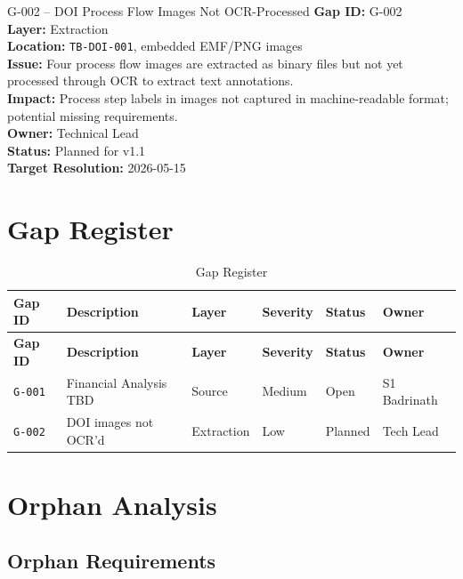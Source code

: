 \documentclass[11pt,a4paper,twoside]{report}
\newcommand{\srcref}[1]{\texttt{#1}}
\newcommand{\gapref}[1]{\texttt{#1}}
\begin{document}
\begin{gapbox}{G-002 -- DOI Process Flow Images Not OCR-Processed}
\textbf{Gap ID:} G-002 \\
\textbf{Layer:} Extraction \\
\textbf{Location:} \srcref{TB-DOI-001}, embedded EMF/PNG images \\
\textbf{Issue:} Four process flow images are extracted as binary files but
not yet processed through OCR to extract text annotations. \\
\textbf{Impact:} Process step labels in images not captured in machine-readable
format; potential missing requirements. \\
\textbf{Owner:} Technical Lead \\
\textbf{Status:} Planned for v1.1 \\
\textbf{Target Resolution:} 2026-05-15
\end{gapbox}

\section{Gap Register}
\label{sec:gap-register}

\begin{longtable}{@{}C{1.5cm}L{4cm}C{2cm}C{2cm}C{2cm}C{2cm}@{}}
\caption{Gap Register}
\label{tab:gap-register} \\
\toprule
\textbf{Gap ID} & \textbf{Description} & \textbf{Layer} & \textbf{Severity} & \textbf{Status} & \textbf{Owner} \\
\midrule
\endfirsthead
\toprule
\textbf{Gap ID} & \textbf{Description} & \textbf{Layer} & \textbf{Severity} & \textbf{Status} & \textbf{Owner} \\
\midrule
\endhead
\gapref{G-001} & Financial Analysis TBD & Source & Medium & Open & S1 Badrinath \\
\gapref{G-002} & DOI images not OCR'd & Extraction & Low & Planned & Tech Lead \\
\bottomrule
\end{longtable}

\section{Orphan Analysis}
\label{sec:orphan-analysis}

\subsection{Orphan Requirements}
\end{document}
